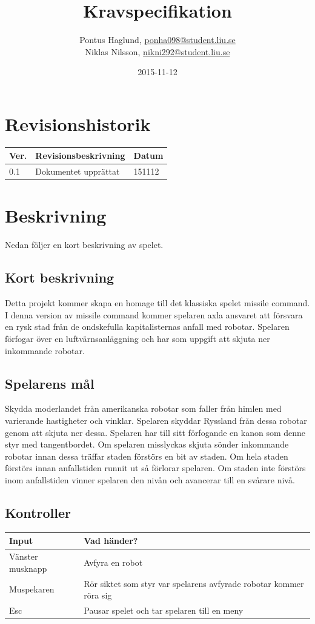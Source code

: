 \documentclass{TDP003mall}
\author{Pontus Haglund, \url{ponha098@student.liu.se}\\
  Niklas Nilsson, \url{nikni292@student.liu.se}}
\title{Kravspecifikation}
\date{2015-11-12}
\begin{document}
\projectpage

\tableofcontents

\newpage

\section{Revisionshistorik}
\begin{table}[!h]
\begin{tabularx}{\linewidth}{|l|X|l|}
\hline
Ver. & Revisionsbeskrivning & Datum \\\hline
0.1 & Dokumentet upprättat & 151112 \\\hline
\end{tabularx}
\end{table}


\section{Beskrivning}
Nedan följer en kort beskrivning av spelet.

\subsection{Kort beskrivning}
Detta projekt kommer skapa en homage till det klassiska spelet missile command. I denna version av missile command kommer spelaren axla ansvaret att försvara en rysk stad från de ondskefulla kapitalisternas anfall med robotar. Spelaren förfogar över en luftvärnsanläggning och har som uppgift att skjuta ner inkommande robotar.

\subsection{Spelarens mål}
Skydda moderlandet från amerikanska robotar som faller från himlen med varierande hastigheter och vinklar. Spelaren skyddar Ryssland från dessa robotar genom att skjuta ner dessa. Spelaren har till sitt förfogande en kanon som denne styr med tangentbordet. Om spelaren misslyckas skjuta sönder inkommande robotar innan dessa träffar staden förstörs en bit av staden. Om hela staden förstörs innan anfallstiden runnit ut så förlorar spelaren. Om staden inte förstörs inom anfallstiden vinner spelaren den nivån och avancerar till en svårare nivå.

\subsection{Kontroller}
\begin{table}[!h]
\begin{tabularx}{\linewidth}{|l|X|}
\hline
Input & Vad händer? \\\hline
Vänster musknapp & Avfyra en robot \\\hline
Muspekaren & Rör siktet som styr var spelarens avfyrade robotar kommer röra sig \\\hline
Esc & Pausar spelet och tar spelaren till en meny \\\hline
\end{tabularx}
\end{table}
\end{document}
